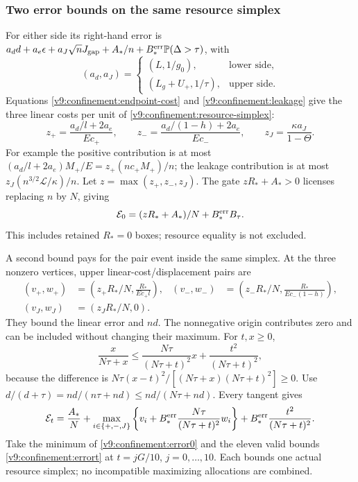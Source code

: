 \subsubsection{Two error bounds on the same resource simplex}
\label{v9:confinement:errors}
For either side its right-hand error is
$a_dd+a_e\epsilon+a_J\sqrt nJ_{\rm gap}+A_*/n+
B_*^{\rm err}\mathbb P(\Delta>\tau)$, with
\[
 (a_d,a_J)=
 \begin{cases}(L,1/g_0),&\text{lower side},\\
              (L_g+U_+,1/\tau),&\text{upper side}.\end{cases}
\]
Equations \eqref{v9:confinement:endpoint-cost} and
\eqref{v9:confinement:leakage} give the three linear costs per unit of
\eqref{v9:confinement:resource-simplex}:
\[
 z_+=\frac{a_d/l+2a_e}{Ec_+},\qquad
 z_-=\frac{a_d/(1-h)+2a_e}{Ec_-},\qquad z_J=\frac{\kappa a_J}{1-\Theta}.
\]
For example the positive contribution is at most
$(a_d/l+2a_e)M_+/E=z_+(nc_+M_+)/n$; the leakage contribution is at
most $z_J(n^{3/2}\mathcal L/\kappa)/n$. Let $z=\max(z_+,z_-,z_J)$.
The gate $zR_*+A_*>0$ licenses replacing $n$ by $N$, giving
\begin{equation}\label{v9:confinement:error0}
 \mathcal E_0=(zR_*+A_*)/N+B_*^{\rm err}B_\tau.
\end{equation}
This includes retained $R_*=0$ boxes; resource equality is not excluded.

A second bound pays for the pair event inside the same simplex. At the
three nonzero vertices, upper linear-cost/displacement pairs are
\begin{align*}
 (v_+,w_+)&=\left(z_+R_*/N,\frac{R_*}{Ec_+l}\right),&
 (v_-,w_-)&=\left(z_-R_*/N,\frac{R_*}{Ec_-(1-h)}\right),\\
 (v_J,w_J)&=(z_JR_*/N,0).
\end{align*}
They bound the linear error and $nd$. The nonnegative origin contributes
zero and can be included without changing their maximum. For $t,x\ge0$,
\[
 \frac{x}{N\tau+x}\le
 \frac{N\tau}{(N\tau+t)^2}x+\frac{t^2}{(N\tau+t)^2},
\]
because the difference is $N\tau(x-t)^2/[(N\tau+x)(N\tau+t)^2]\ge0$.
Use $d/(d+\tau)=nd/(n\tau+nd)\le nd/(N\tau+nd)$. Every tangent gives
\begin{equation}\label{v9:confinement:errort}
 \mathcal E_t=\frac{A_*}{N}+
 \max_{i\in\{+,-,J\}}\left\{v_i+B_*^{\rm err}
                 \frac{N\tau}{(N\tau+t)^2}w_i\right\}
 +B_*^{\rm err}\frac{t^2}{(N\tau+t)^2}.
\end{equation}
Take the minimum of \eqref{v9:confinement:error0} and the eleven valid
bounds \eqref{v9:confinement:errort} at $t=jG/10$, $j=0,\ldots,10$.
Each bounds one actual resource simplex; no incompatible maximizing
allocations are combined.

